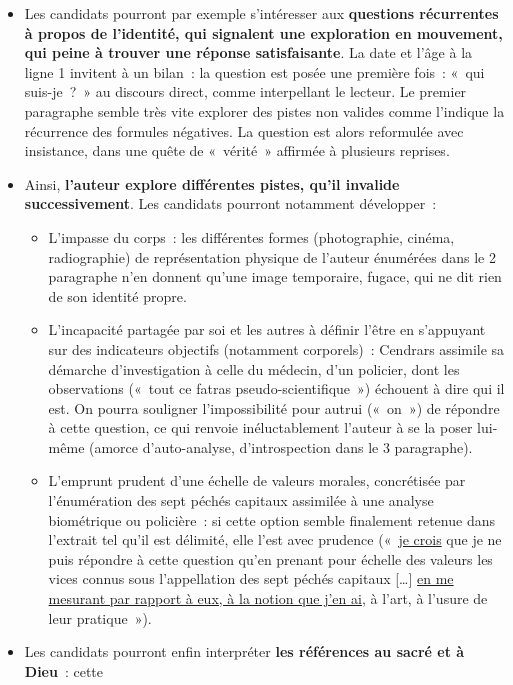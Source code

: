 {\begin{itemize}[label=\textbullet]
\item Les candidats pourront par exemple s'intéresser aux \textbf{questions récurrentes à propos
de l'identité, qui signalent une exploration en mouvement, qui peine à trouver
une réponse satisfaisante}. La date et l'âge à la ligne 1 invitent à un bilan~: la question
est posée une première fois~: «~qui suis-je~?~» au discours direct, comme interpellant
le lecteur. Le premier paragraphe semble très vite explorer des pistes non valides
comme l'indique la récurrence des formules négatives. La question est alors
reformulée avec insistance, dans une quête de «~vérité~» affirmée à plusieurs reprises.
\item Ainsi, \textbf{l'auteur explore différentes pistes, qu'il invalide successivement}. Les
candidats pourront notamment développer~:
\begin{itemize}[label=$\circ$]
\item L'impasse du corps~: les différentes formes (photographie, cinéma,
radiographie) de représentation physique de l'auteur énumérées dans le 2\ieme{}
paragraphe n'en donnent qu'une image temporaire, fugace, qui ne dit rien de
son identité propre.
\item L'incapacité partagée par soi et les autres à définir l'être en s'appuyant sur des
indicateurs objectifs (notamment corporels)~: Cendrars assimile sa démarche
d'investigation à celle du médecin, d'un policier, dont les observations («~tout
ce fatras pseudo-scientifique~») échouent à dire qui il est. On pourra souligner
l'impossibilité pour autrui («~on~») de répondre à cette question, ce qui renvoie
inéluctablement l'auteur à se la poser lui-même (amorce d'auto-analyse,
d'introspection dans le 3\ieme{} paragraphe).
\item L'emprunt prudent d'une échelle de valeurs morales, concrétisée par
l'énumération des sept péchés capitaux assimilée à une analyse biométrique
ou policière~: si cette option semble finalement retenue dans l'extrait tel qu'il est
délimité, elle l'est avec prudence («~\underline{je crois} que je ne puis répondre à cette
question qu'en prenant pour échelle des valeurs les vices connus sous
l'appellation des sept péchés capitaux […] \underline{en me mesurant par rapport à eux,
à la notion que j'en ai}, à l'art, à l'usure de leur pratique~»).
\end{itemize}
\item Les candidats pourront enfin interpréter \textbf{les références au sacré et à Dieu}~: cette

\end{itemize}}
